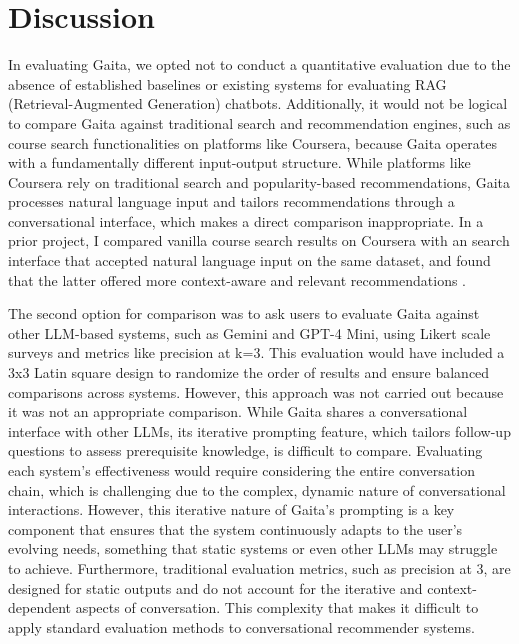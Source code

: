 \chapter{Discussion} \label{chap:chap-6}

In evaluating Gaita, we opted not to conduct a quantitative evaluation due to the absence of established baselines or existing systems for evaluating RAG (Retrieval-Augmented Generation) chatbots. Additionally, it would not be logical to compare Gaita against traditional search and recommendation engines, such as course search functionalities on platforms like Coursera, because Gaita operates with a fundamentally different input-output structure. While platforms like Coursera rely on traditional search and popularity-based recommendations, Gaita processes natural language input and tailors recommendations through a conversational interface, which makes a direct comparison inappropriate. In a prior project, I compared vanilla course search results on Coursera with an search interface that accepted natural language input on the same dataset, and found that the latter offered more context-aware and relevant recommendations \cite{wong_advancing_2024}.

The second option for comparison was to ask users to evaluate Gaita against other LLM-based systems, such as Gemini and GPT-4 Mini, using Likert scale surveys and metrics like precision at k=3. This evaluation would have included a 3x3 Latin square design to randomize the order of results and ensure balanced comparisons across systems. However, this approach was not carried out because it was not an appropriate comparison. While Gaita shares a conversational interface with other LLMs, its iterative prompting feature, which tailors follow-up questions to assess prerequisite knowledge, is difficult to compare. Evaluating each system’s effectiveness would require considering the entire conversation chain, which is challenging due to the complex, dynamic nature of conversational interactions. However, this iterative nature of Gaita’s prompting is a key component that ensures that the system continuously adapts to the user’s evolving needs, something that static systems or even other LLMs may struggle to achieve. Furthermore, traditional evaluation metrics, such as precision at 3, are designed for static outputs and do not account for the iterative and context-dependent aspects of conversation. This complexity that makes it difficult to apply standard evaluation methods to conversational recommender systems. 

